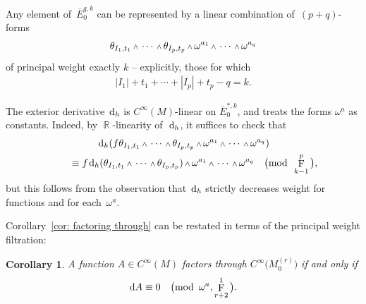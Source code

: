 \documentclass[10pt,a4paper]{amsart}
\DeclareMathOperator{\R}{\mathbb{R}}
\renewcommand{\d}{{\rm d}}
\newcommand{\cinfinity}[1]{C^\infty\big(#1\big)}
\renewcommand{\mod}[1]{\quad\big(\mathrm{mod\enspace} #1\big)}
\newcommand{\w}{{\mathchoice{\,{\scriptstyle\wedge}\,}{{\scriptstyle\wedge}}
 {{\scriptscriptstyle\wedge}}{{\scriptscriptstyle\wedge}}}}
\newcommand{\M}[1]{M_0^{(#1)}}
\newcommand{\thetas}[1]{\theta_{#1}}
\DeclareMathOperator{\pwf}{F}
\renewcommand{\dh}{\ensuremath{\hspace{1pt} \d_h}}
\newcommand{\cMinfty}{C^\infty(M)}
\numberwithin{equation}{section}
\newtheorem{Corollary}[Theorem]{Corollary}
\begin{document}
\begin{Example}
 Any element of~$\overline{E}_0^{q,k}$ can be represented by a linear combination of~$(p+q)$-forms
 \begin{gather*}
 \thetas{I_1,t_1}\w\cdots\w\thetas{I_p,t_p}\w\omega^{a_1}\w\cdots\w\omega^{a_{q}}
 \end{gather*}
 of principal weight exactly $k$ -- explicitly, those for which
 \begin{gather*}
 |I_1| + t_1 +\cdots + |I_p| + t_p - q = k .
 \end{gather*}

 The exterior derivative $\dh$ is $\cMinfty$-linear on $\overline{E}_0^{*,k}$, and treats the forms $\omega^a$ as constants. Indeed, by $\R$-linearity of~$\dh$, it suffices to check that
 \begin{gather*}
 \dh (f\thetas{I_1,t_1}\w\cdots\w\thetas{I_p,t_p}\w\omega^{a_1}\w\cdots\w\omega^{a_q})
 \\ \qquad
 {} \equiv f\dh(\thetas{I_1,t_1}\w\cdots\w\thetas{I_p,t_p})\w\omega^{a_1}\w\cdots\w\omega^{a_q} \mod{\pwf^{p}_{k-1}} ,
 \end{gather*}
 but this follows from the observation that $\dh$ strictly decreases weight for functions and for each~$\omega^a$.

 Corollary~\ref{cor: factoring through} can be restated in terms of the principal weight filtration:
 \begin{Corollary}\label{cor:factoring through by weight}
 A function $A \in \cMinfty$ factors through $\cinfinity{\M{r}}$ if and only if
 \begin{gather*}
 \d A \equiv 0 \mod{\omega^a, \pwf^1_{r+2}} .
 \end{gather*}
 \end{Corollary}
\end{Example}
\end{document}
